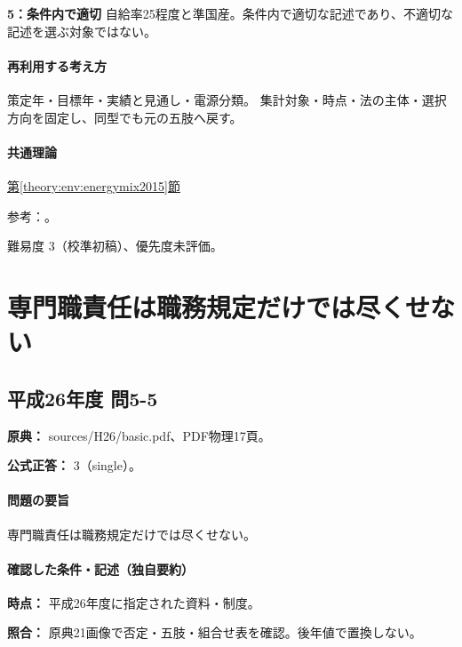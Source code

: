\noindent\textbf{5：条件内で適切} 自給率25程度と準国産。条件内で適切な記述であり、不適切な記述を選ぶ対象ではない。\par

\paragraph{再利用する考え方} 策定年・目標年・実績と見通し・電源分類。 集計対象・時点・法の主体・選択方向を固定し、同型でも元の五肢へ戻す。

\paragraph{共通理論} \hyperref[theory:env:energymix2015]{第\ref*{theory:env:energymix2015}節}

\par 参考：\cite{env58_mix2015}。

\par 難易度 3（校準初稿）、優先度未評価。

\section{専門職責任は職務規定だけでは尽くせない}

\subsection{平成26年度 問5-5}
\label{q:h26-reg-basic-5-5}

\noindent\textbf{原典：} sources/H26/basic.pdf、PDF物理17頁。

\textbf{公式正答：} 3（single）。

\paragraph{問題の要旨} 専門職責任は職務規定だけでは尽くせない。

\paragraph{確認した条件・記述（独自要約）}\mbox{}\par

\noindent\textbf{時点：} 平成26年度に指定された資料・制度。\par

\noindent\textbf{照合：} 原典21画像で否定・五肢・組合せ表を確認。後年値で置換しない。\par

